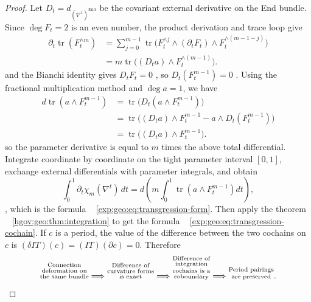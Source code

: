 \documentclass[12pt,a4paper,openany,notitlepage]{report}
\theoremstyle{plain}
\theoremstyle{definition}
\theoremstyle{remark}
\def\mathcal#1{#1}\def\mathsf#1{#1}\def\mathbb#1{#1}%
\begin{document}
\begin{CJK*}
\begin{proof}
Let $\mathcal D_t=d_{(\nabla^t)^{\operatorname{End}}}$ be the covariant external derivative on the End bundle. Since $\deg F_t=2$ is an even number, the product derivation and trace loop give \[
\begin{aligned}
\partial_t\operatorname{tr}(F_t^{\wedge m})
&=\sum_{j=0}^{m-1}
\operatorname{tr}\bigl(F_t^{\wedge j}\wedge(\partial_tF_t)
\wedge F_t^{\wedge(m-1-j)}\bigr)\\
&=m\operatorname{tr}\bigl((\mathcal D_ta)\wedge F_t^{\wedge(m-1)}\bigr).
\end{aligned}
\] and the Bianchi identity gives $\mathcal D_tF_t=0$ , so $\mathcal D_t(F_t^{m-1})=0$ . Using the fractional multiplication method and $\deg a=1$, we have \[
\begin{aligned}
d\operatorname{tr}(a\wedge F_t^{m-1})
&=\operatorname{tr}\bigl(\mathcal D_t(a\wedge F_t^{m-1})\bigr)\\
&=\operatorname{tr}\bigl((\mathcal D_ta)\wedge F_t^{m-1}
-a\wedge\mathcal D_t(F_t^{m-1})\bigr)\\
&=\operatorname{tr}\bigl((\mathcal D_ta)\wedge F_t^{m-1}\bigr).
\end{aligned}
\] so the parameter derivative is equal to $m$ times the above total differential. Integrate coordinate by coordinate on the tight parameter interval $[0,1]$, exchange external differentials with parameter integrals, and obtain \[
\int_0^1\partial_t\chi_m(\nabla^t)\,dt
=d\left(m\int_0^1\operatorname{tr}(a\wedge F_t^{m-1})dt\right),
\], which is the formula ~ \eqref{exp:geo:eq:transgression-form}. Then apply the theorem ~ \ref{hgov:geo:thm:integration} to get the formula ~ \eqref{exp:geo:eq:transgression-cochain}. If $c$ is a period, the value of the difference between the two cochains on $c$ is $(\delta I\mathsf T)(c)=(I\mathsf T)(\partial c)=0$. Therefore \[
\text{\shortstack[c]{\scriptsize Connection\\[-1pt]\scriptsize deformation on\\[-1pt]\scriptsize the same bundle}}\Longrightarrow\text{\shortstack[c]{\scriptsize Difference of\\[-1pt]\scriptsize curvature forms\\[-1pt]\scriptsize is exact}}
\Longrightarrow\text{\shortstack[c]{\scriptsize Difference of\\[-1pt]\scriptsize integration\\[-1pt]\scriptsize cochains is a\\[-1pt]\scriptsize coboundary}}
\Longrightarrow\text{\shortstack[c]{\scriptsize Period pairings\\[-1pt]\scriptsize are preserved}}.
\]\end{proof}



\end{CJK*}
\end{document}
